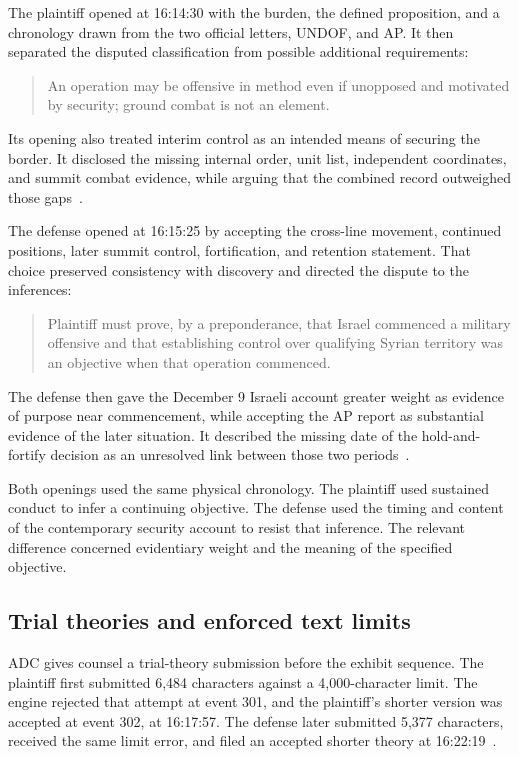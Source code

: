The plaintiff opened at 16:14:30 with the burden, the defined proposition, and a chronology drawn from the two official letters, UNDOF, and AP.  It then separated the disputed classification from possible additional requirements:
\begin{quote}
An operation may be offensive in method even if unopposed and motivated by security; ground combat is not an element.
\end{quote}
Its opening also treated interim control as an intended means of securing the border.  It disclosed the missing internal order, unit list, independent coordinates, and summit combat evidence, while arguing that the combined record outweighed those gaps~\cite[event 298]{record}.

The defense opened at 16:15:25 by accepting the cross-line movement, continued positions, later summit control, fortification, and retention statement.  That choice preserved consistency with discovery and directed the dispute to the inferences:
\begin{quote}
Plaintiff must prove, by a preponderance, that Israel commenced a military offensive and that establishing control over qualifying Syrian territory was an objective when that operation commenced.
\end{quote}
The defense then gave the December 9 Israeli account greater weight as evidence of purpose near commencement, while accepting the AP report as substantial evidence of the later situation.  It described the missing date of the hold-and-fortify decision as an unresolved link between those two periods~\cite[event 299]{record}.

Both openings used the same physical chronology.  The plaintiff used sustained conduct to infer a continuing objective.  The defense used the timing and content of the contemporary security account to resist that inference.  The relevant difference concerned evidentiary weight and the meaning of the specified objective.

\subsection{Trial theories and enforced text limits}

ADC gives counsel a trial-theory submission before the exhibit sequence.  The plaintiff first submitted 6,484 characters against a 4,000-character limit.  The engine rejected that attempt at event 301, and the plaintiff's shorter version was accepted at event 302, at 16:17:57.  The defense later submitted 5,377 characters, received the same limit error, and filed an accepted shorter theory at 16:22:19~\cite[events 301--302 and 312--313]{record}.

